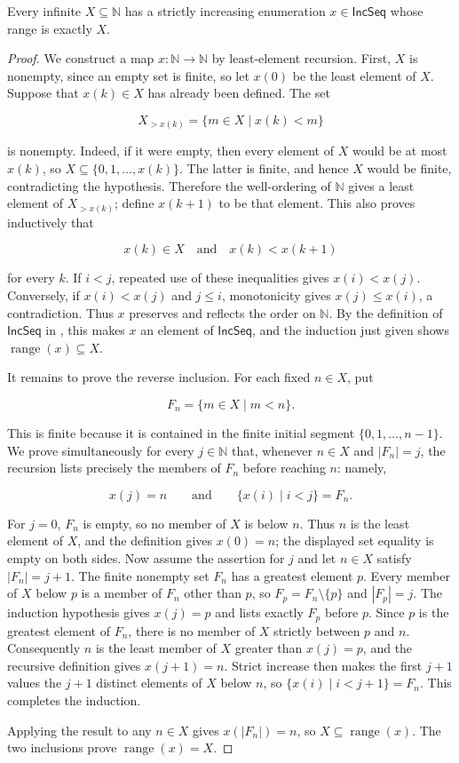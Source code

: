 \begin{lemma}
Every infinite $X\subseteq\mathbb N$ has a strictly increasing enumeration
$x\in\mathsf{IncSeq}$ whose range is exactly $X$.
\end{lemma}
\begin{proof}
We construct a map $x:\mathbb N\to\mathbb N$ by least-element recursion.  First,
$X$ is nonempty, since an empty set is finite, so let $x(0)$ be the least
element of $X$.  Suppose that $x(k)\in X$ has already been defined.  The set

\[
X_{>x(k)}=\{m\in X\mid x(k)<m\}
\]

is nonempty.  Indeed, if it were empty, then every element of $X$ would be
at most $x(k)$, so $X\subseteq\{0,1,\ldots,x(k)\}$.  The latter is finite,
and hence $X$ would be finite, contradicting the hypothesis.  Therefore the
well-ordering of $\mathbb N$ gives a least element of $X_{>x(k)}$; define
$x(k+1)$ to be that element.  This also proves inductively that

\[
x(k)\in X\quad\text{and}\quad x(k)<x(k+1)
\]

for every $k$.  If $i<j$, repeated use of these inequalities gives
$x(i)<x(j)$.  Conversely, if $x(i)<x(j)$ and $j\leq i$, monotonicity gives
$x(j)\leq x(i)$, a contradiction.  Thus $x$ preserves and reflects the
order on $\mathbb N$.  By the definition of $\mathsf{IncSeq}$ in
, this makes $x$ an element of $\mathsf{IncSeq}$, and the
induction just given shows $\operatorname{range}(x)\subseteq X$.

It remains to prove the reverse inclusion.  For each fixed $n\in X$, put

\[
F_n=\{m\in X\mid m<n\}.
\]

This is finite because it is contained in the finite initial segment
$\{0,1,\ldots,n-1\}$.  We prove simultaneously for every $j\in\mathbb N$
that, whenever $n\in X$ and $|F_n|=j$, the recursion lists precisely the
members of $F_n$ before reaching $n$: namely,

\[
x(j)=n
\qquad\text{and}\qquad
\{x(i)\mid i<j\}=F_n.
\]

For $j=0$, $F_n$ is empty, so no member of $X$ is below $n$.  Thus $n$ is
the least element of $X$, and the definition gives $x(0)=n$; the displayed
set equality is empty on both sides.  Now assume the assertion for $j$ and
let $n\in X$ satisfy $|F_n|=j+1$.  The finite nonempty set $F_n$ has a
greatest element $p$.  Every member of $X$ below $p$ is a member of $F_n$
other than $p$, so $F_p=F_n\setminus\{p\}$ and $|F_p|=j$.  The induction
hypothesis gives $x(j)=p$ and lists exactly $F_p$ before $p$.  Since $p$ is
the greatest element of $F_n$, there is no member of $X$ strictly between
$p$ and $n$.  Consequently $n$ is the least member of $X$ greater than
$x(j)=p$, and the recursive definition gives $x(j+1)=n$.  Strict increase
then makes the first $j+1$ values the $j+1$ distinct elements of $X$ below
$n$, so $\{x(i)\mid i<j+1\}=F_n$.  This completes the induction.

Applying the result to any $n\in X$ gives $x(|F_n|)=n$, so
$X\subseteq\operatorname{range}(x)$.  The two inclusions prove
$\operatorname{range}(x)=X$.
\end{proof}
